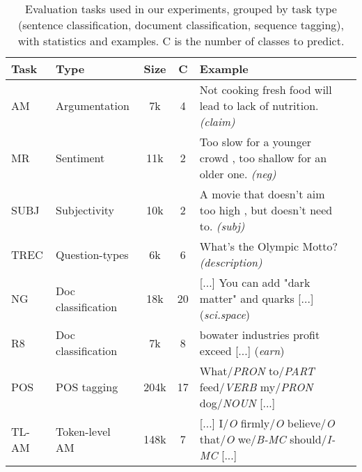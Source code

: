 \begin{table*}[!htb]
\centering
\small
\begin{tabular}{llccll}
\toprule
\textbf{Task} & \textbf{Type} & \textbf{Size} & \textbf{C} & \textbf{Example} \\ 
\midrule
{AM} & Argumentation & 7k  & 4 &
Not cooking fresh food will lead to lack of nutrition. \textit{(claim)} 
 \\
{MR} & Sentiment & 11k & 2 & Too slow for a younger crowd , too shallow for an older one. \textit{(neg)} \\
{SUBJ} & Subjectivity & 10k & 2 & A movie that doesn’t aim too high , but doesn’t need to. \textit{(subj)} \\
{TREC} & Question-types & 6k & 6 & What's the Olympic Motto? \textit{(description)} \\
\midrule
NG & Doc classification & 18k & 20 & [...] You can add "dark matter" and quarks [...] (\emph{sci.space})\\
R8 & Doc classification & 7k & 8 & bowater industries profit exceed [...] (\emph{earn})\\
\midrule
POS & POS tagging & 204k & 17 & What/\emph{PRON} to/\emph{PART} feed/\emph{VERB} my/\emph{PRON} dog/\emph{NOUN} [...]\\
TL-AM & Token-level AM & 148k & 7 & [...] I/\emph{O} firmly/\emph{O} believe/\emph{O} that/\emph{O} we/\emph{B-MC} should/\emph{I-MC} [...]\\
\bottomrule
\end{tabular}
\caption{Evaluation tasks used in our experiments, grouped by task type (sentence classification, document classification, sequence tagging), with statistics and examples. C is the number of classes to predict.}
\label{table:data_sent}
\end{table*}
